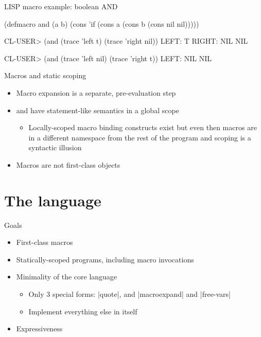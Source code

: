 \begin{frame}[fragile]{LISP macro example: boolean AND}
\begin{listingbox}\begin{schemecode}
(defmacro and (a b)
  (cons 'if (cons a (cons b (cons nil nil)))))
\end{schemecode}\end{listingbox}
\vspace{1em}
\begin{listingbox}\begin{schemerepl}
CL-USER> (and (trace 'left t) (trace 'right nil))
LEFT: T
RIGHT: NIL
NIL

CL-USER> (and (trace 'left nil) (trace 'right t))
LEFT: NIL
NIL
\end{schemerepl}\end{listingbox}
\end{frame}

\begin{frame}{Macros and static scoping}
\begin{itemize}
\item Macro expansion is a separate, pre-evaluation step
\item {} and  have statement-like semantics in a global scope
\begin{itemize}
  \item Locally-scoped macro binding constructs exist but even then macros are in
        a different namespace from the rest of the program and scoping is a syntactic illusion
\end{itemize}
\item Macros are not first-class objects
\end{itemize}
\end{frame}

\section{The language \lang}

\begin{frame}[fragile]{Goals}
\begin{itemize}
    \item First-class macros
    \item Statically-scoped programs, including macro invocations
    \item Minimality of the core language
        \begin{itemize}
            \item Only 3 special forms: \linline|quote|, and \linline|macroexpand| and \linline|free-vars|
            \item Implement everything else in \lang itself
        \end{itemize}
    \item Expressiveness
\end{itemize}
\end{frame}

